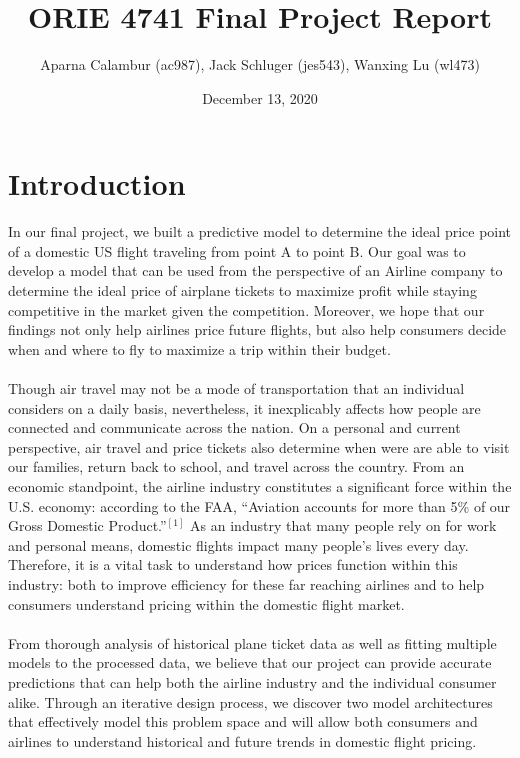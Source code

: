 \documentclass{article}
\title{ORIE 4741 Final Project Report}
\author{Aparna Calambur (ac987), Jack Schluger (jes543), Wanxing Lu (wl473)}
\date{December 13, 2020}
\begin{document}
\twocolumn
\maketitle

\section{Introduction}
In our final project, we built a predictive model to determine the ideal price point of a domestic US flight traveling from point A to point B. Our goal was to develop a model that can be used from the perspective of an Airline company to determine the ideal price of airplane tickets to maximize profit while staying competitive in the market given the competition. Moreover, we hope that our findings not only help airlines price future flights, but also help consumers decide when and where to fly to maximize a trip within their budget.\\\\
Though air travel may not be a mode of transportation that an individual considers on a daily basis, nevertheless, it inexplicably affects how people are connected and communicate across the nation. On a personal and current perspective, air travel and price tickets also determine when were are able to visit our families, return back to school, and travel across the country. From an economic standpoint, the airline industry constitutes a significant force within the U.S. economy: according to the FAA, “Aviation accounts for more than 5\% of our Gross Domestic Product.”$^{[1]}$ As an industry that many people rely on for work and personal means, domestic flights impact many people’s lives every day. Therefore, it is a vital task to understand how prices function within this industry: both to improve efficiency for these far reaching airlines and to help consumers understand pricing within the domestic flight market.\\\\
From thorough analysis of historical plane ticket data as well as fitting multiple models to the processed data, we believe that our project can provide accurate predictions that can help both the airline industry and the individual consumer alike. Through an iterative design process, we discover two model architectures that effectively model this problem space and will allow both consumers and airlines to understand historical and future trends in domestic flight pricing. 
\end{document}
